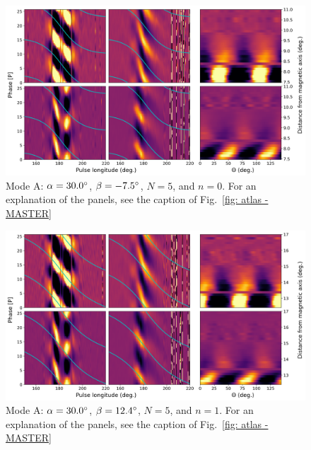 \begin{figure}
	\begin{center}
		\includegraphics[width=\atlasHeightFrac\textwidth]{Figures/B0031/atlas/A_517030005000_plots}
		\caption[Atlas results: Mode A -- $\alpha=30.0\degr$, $\beta=-7.5\degr$, $N=5$, $n=0$]{Mode A: $\alpha=30.0\degr$, $\beta=-7.5\degr$, $N=5$, and $n=0$. For an explanation of the panels, see the caption of Fig.~\ref{fig: atlas - MASTER} }
		\label{fig: atlas - A_517030005000}
	\end{center}
\end{figure}

\begin{figure}
	\begin{center}
		\includegraphics[width=\atlasHeightFrac\textwidth]{Figures/B0031/atlas/A_517030005001_plots}
		\caption[Atlas results: Mode A -- $\alpha=30.0\degr$, $\beta=12.4\degr$, $N=5$, $n=1$]{Mode A: $\alpha=30.0\degr$, $\beta=12.4\degr$, $N=5$, and $n=1$. For an explanation of the panels, see the caption of Fig.~\ref{fig: atlas - MASTER} }
		\label{fig: atlas - A_517030005001}
	\end{center}
\end{figure}

